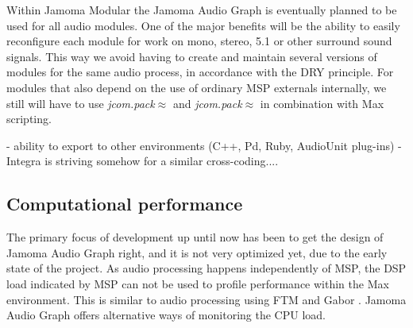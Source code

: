 \documentclass[twoside,a4paper]{article}
\begin{document}
Within Jamoma Modular the Jamoma Audio Graph is eventually planned to be used for all audio modules.
One of the major benefits will be the ability to easily reconfigure each module for work on mono, stereo, 5.1 or other surround sound signals.
This way we avoid having to create and maintain several versions of modules for the same audio process, in accordance with the DRY principle.
For modules that also depend on the use of ordinary MSP externals internally, we still will have to use \emph{jcom.pack$\approx$} and \emph{jcom.pack$\approx$} in combination with Max scripting.



- ability to export to other environments (C++, Pd, Ruby, AudioUnit plug-ins)
- Integra is striving somehow for a similar cross-coding....



\subsection{Computational performance} %

The primary focus of development up until now has been to get the design of Jamoma Audio Graph right, and it is not very optimized yet, due to the early state of the project.
As audio processing happens independently of MSP, the DSP load indicated by MSP can not be used to profile performance within the Max environment.
This is similar to audio processing using FTM and Gabor \cite{Schnell:2005_Gabor}.
Jamoma Audio Graph offers alternative ways of monitoring the CPU load.


 
\end{document}
